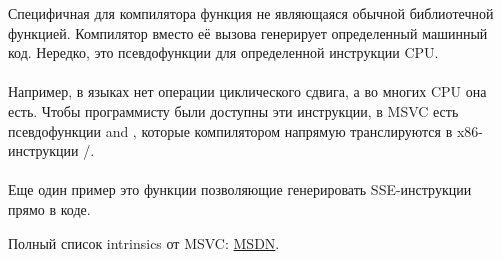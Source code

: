 \label{sec:compiler_intrinsic}

Специфичная для компилятора функция не являющаяся обычной библиотечной функцией.
Компилятор вместо её вызова генерирует определенный машинный код.
Нередко, это псевдофункции для определенной инструкции \ac{CPU}. \\
\\
Например, в языках \CCpp нет операции циклического сдвига, а во многих \ac{CPU} она есть.
Чтобы программисту были доступны эти инструкции, в MSVC есть псевдофункции 
 and \FNMSDNROTxURL{},
которые компилятором напрямую транслируются в x86-инструкции /. \\
\\
Еще один пример это функции позволяющие генерировать SSE-инструкции прямо в коде.

Полный список intrinsics от MSVC: \href{http://go.yurichev.com/17254}{MSDN}.

